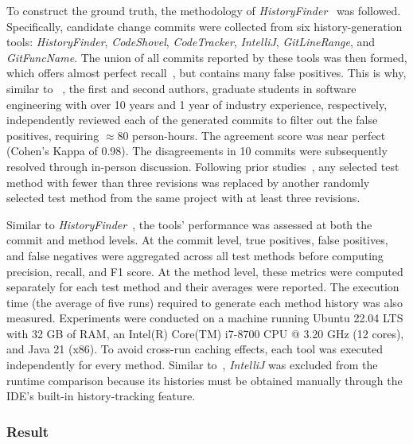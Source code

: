 To construct the ground truth, the methodology of \emph{HistoryFinder}~\cite{islam_historyfinder_2025} was followed. Specifically, candidate change commits were collected from six history-generation tools: \emph{HistoryFinder}, \emph{CodeShovel}, \emph{CodeTracker}, \emph{IntelliJ}, \emph{GitLineRange}, and \emph{GitFuncName}. The union of all commits reported by these tools was then formed, which offers almost perfect recall~\cite{islam_historyfinder_2025}, but contains many false positives. This is why, similar to ~\cite{islam_historyfinder_2025}, the first and second authors, graduate students in software engineering with over 10 years and 1 year of industry experience, respectively, independently reviewed each of the generated commits to filter out the false positives, requiring $\approx$80 person-hours. The agreement score was near perfect (Cohen's Kappa of 0.98). The disagreements in 10 commits were subsequently resolved through in-person discussion. Following prior studies~\cite{grund:2021,islam_historyfinder_2025}, any selected test method with fewer than three revisions was replaced by another randomly selected test method from the same project with at least three revisions.


Similar to \emph{HistoryFinder}~\cite{islam_historyfinder_2025}, the tools' performance was assessed at both the commit and method levels. At the commit level, true positives, false positives, and false negatives were aggregated across all test methods before computing precision, recall, and F1 score. At the method level, these metrics were computed separately for each test method and their averages were reported. The execution time (the average of five runs) required to generate each method history was also measured. Experiments were conducted on a machine running Ubuntu 22.04 LTS with 32 GB of RAM, an Intel(R) Core(TM) i7-8700 CPU @ 3.20 GHz (12 cores), and Java 21 (x86). To avoid cross-run caching effects, each tool was executed independently for every method. Similar to~\cite{islam_historyfinder_2025}, \emph{IntelliJ} was excluded from the runtime comparison because its histories must be obtained manually through the IDE's built-in history-tracking feature.

\subsubsection{Result}
\begin{table}[htbp]
\centering
\caption{Accuracy of the method-history tracking tools. \textbf{TP} denotes correctly identified change commits, \textbf{FP} denotes incorrectly included commits, and \textbf{FN} denotes missed change commits.}
\label{tab:t2p-method-tracking-score}


\end{table}


